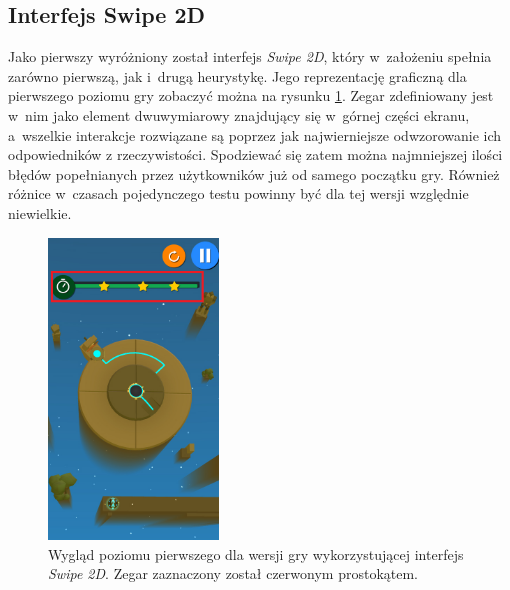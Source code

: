 \documentclass[a4paper,12pt,numbers=noenddot]{report}
\begin{document}
\subsection{Interfejs Swipe 2D}
Jako pierwszy wyróżniony został interfejs \textit{Swipe 2D}, który w~założeniu spełnia zarówno pierwszą, jak i~drugą heurystykę. Jego reprezentację graficzną dla pierwszego poziomu gry zobaczyć można na rysunku \ref{fig:interface_Swipe_2d}. Zegar zdefiniowany jest w~nim jako element dwuwymiarowy znajdujący się w~górnej części ekranu, a~wszelkie interakcje rozwiązane są poprzez jak najwierniejsze odwzorowanie ich odpowiedników z rzeczywistości. Spodziewać się zatem można najmniejszej ilości błędów popełnianych przez użytkowników już od samego początku gry. Również różnice w~czasach pojedynczego testu powinny być dla tej wersji względnie niewielkie.
\begin{figure}[h!]
	\centering
  	\includegraphics[height=8cm]{fig/timer_2d.jpg}
	\caption{Wygląd poziomu pierwszego dla wersji gry wykorzystującej interfejs \textit{Swipe 2D}. Zegar zaznaczony został czerwonym prostokątem. }
	\label{fig:interface_Swipe_2d}
\end{figure}
\end{document}
